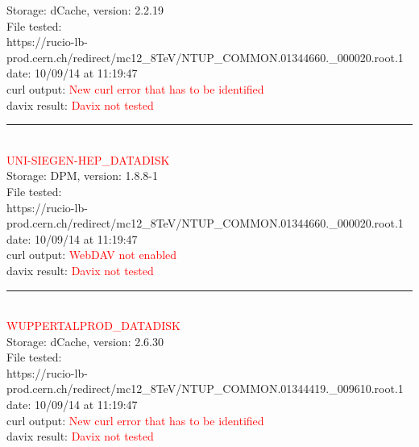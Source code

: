 Storage: dCache, version: 2.2.19\\

File tested:\\
\footnotesize{https://rucio-lb-prod.cern.ch/redirect/mc12\_8TeV/NTUP\_COMMON.01344660.\_000020.root.1}\\

date: 10/09/14 at 11:19:47\\

curl output:  \textcolor{red}{New curl error that has to be identified}\\

davix result:  \textcolor{red}{Davix not tested}\\

\rule{\textwidth}{1pt}\\

\textcolor{red}{\normalsize{UNI-SIEGEN-HEP\_DATADISK}}\\

Storage: DPM, version: 1.8.8-1\\

File tested:\\
\footnotesize{https://rucio-lb-prod.cern.ch/redirect/mc12\_8TeV/NTUP\_COMMON.01344660.\_000020.root.1}\\

date: 10/09/14 at 11:19:47\\

curl output:  \textcolor{red}{WebDAV not enabled}\\

davix result:  \textcolor{red}{Davix not tested}\\

\rule{\textwidth}{1pt}\\

\textcolor{red}{\normalsize{WUPPERTALPROD\_DATADISK}}\\

Storage: dCache, version: 2.6.30\\

File tested:\\
\footnotesize{https://rucio-lb-prod.cern.ch/redirect/mc12\_8TeV/NTUP\_COMMON.01344419.\_009610.root.1}\\

date: 10/09/14 at 11:19:47\\

curl output:  \textcolor{red}{New curl error that has to be identified}\\

davix result:  \textcolor{red}{Davix not tested}\\

